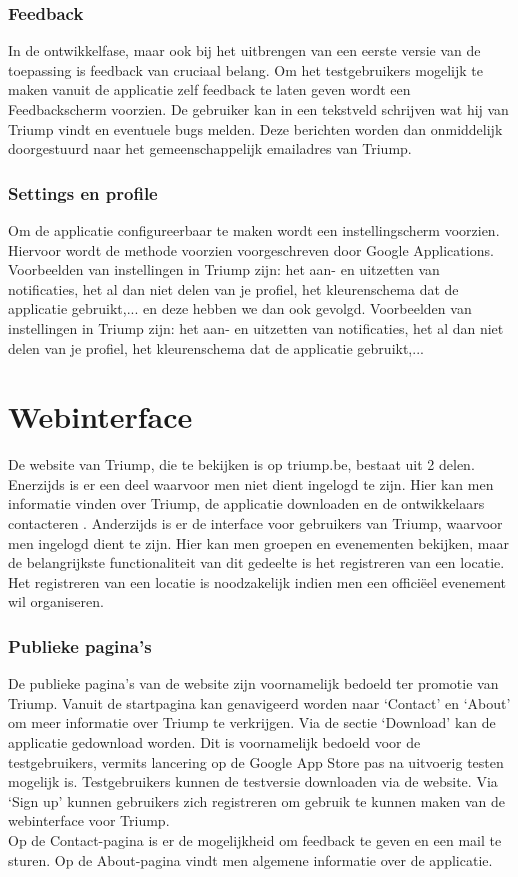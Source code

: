 \subsubsection{Feedback}%
In de ontwikkelfase, maar ook bij het uitbrengen van een eerste versie van de toepassing is feedback van cruciaal belang. Om het testgebruikers mogelijk te maken vanuit de applicatie zelf feedback te laten geven wordt een Feedbackscherm voorzien. De gebruiker kan in een tekstveld schrijven wat hij van Triump vindt en eventuele bugs melden. Deze berichten worden dan onmiddelijk doorgestuurd naar het gemeenschappelijk emailadres van Triump.
\subsubsection{Settings en profile}%
Om de applicatie configureerbaar te maken wordt een instellingscherm voorzien. Hiervoor wordt de methode voorzien voorgeschreven door Google Applications.
Voorbeelden van instellingen in Triump zijn: het aan- en uitzetten van notificaties, het al dan niet delen van je profiel, het kleurenschema dat de applicatie gebruikt,...
en deze hebben we dan ook gevolgd. Voorbeelden van instellingen in Triump zijn: het aan- en uitzetten van notificaties, het al dan niet delen van je profiel, het kleurenschema dat de applicatie gebruikt,...



\section{Webinterface}%
De website van Triump, die te bekijken is op triump.be, bestaat uit 2 delen. Enerzijds is er een deel waarvoor men niet dient ingelogd te zijn. Hier kan men informatie vinden over Triump, de applicatie downloaden en de ontwikkelaars contacteren . Anderzijds is er de interface voor gebruikers van Triump, waarvoor men ingelogd dient te zijn. Hier kan men groepen en evenementen bekijken, maar de belangrijkste functionaliteit van dit gedeelte is het registreren van een locatie.
Het registreren van een locatie is noodzakelijk indien men een officiëel evenement wil organiseren.
\subsubsection{Publieke pagina's}
De publieke pagina's van de website zijn voornamelijk bedoeld ter promotie van Triump. Vanuit de startpagina kan genavigeerd worden naar `Contact' en `About' om meer informatie over Triump te verkrijgen. Via de sectie `Download' kan de applicatie gedownload worden. Dit is voornamelijk bedoeld voor de testgebruikers, vermits lancering op de Google App Store pas na uitvoerig testen mogelijk is. Testgebruikers kunnen de testversie downloaden via de website. Via `Sign up' kunnen gebruikers zich registreren om gebruik te kunnen maken van de webinterface voor Triump.\\
Op de Contact-pagina is er de mogelijkheid om feedback te geven en een mail te sturen.
Op de About-pagina vindt men algemene informatie over de applicatie.
